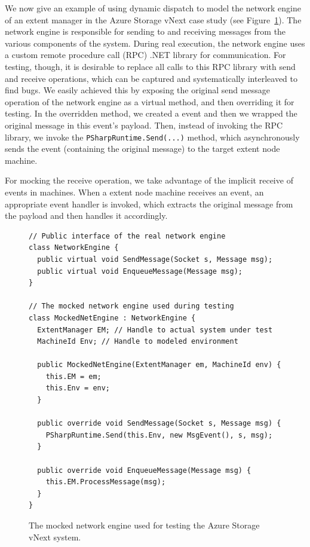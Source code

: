 We now give an example of using dynamic dispatch to model the network engine of an extent manager in the Azure Storage vNext case study (see Figure~\ref{fig:enginecode}). The network engine is responsible for sending to and receiving messages from the various components of the system. During real execution, the network engine uses a custom remote procedure call (RPC) .NET library for communication. For testing, though, it is desirable to replace all calls to this RPC library with \psharp send and receive operations, which can be captured and systematically interleaved to find bugs. We easily achieved this by exposing the original send message operation of the network engine as a virtual method, and then overriding it for testing. In the overridden method, we created a \psharp event and then we wrapped the original message in this event's payload. Then, instead of invoking the RPC library, we invoke the \texttt{PSharpRuntime.Send(...)} method, which asynchronously sends the event (containing the original message) to the target extent node machine.

For mocking the receive operation, we take advantage of the implicit receive of events in \psharp machines. When a extent node machine receives an event, an appropriate event handler is invoked, which extracts the original message from the payload and then handles it accordingly.

\begin{figure}[t]
\begin{lstlisting}
// Public interface of the real network engine
class NetworkEngine {
  public virtual void SendMessage(Socket s, Message msg);
  public virtual void EnqueueMessage(Message msg);
}

// The mocked network engine used during testing
class MockedNetEngine : NetworkEngine {
  ExtentManager EM; // Handle to actual system under test
  MachineId Env; // Handle to modeled environment
  
  public MockedNetEngine(ExtentManager em, MachineId env) {
    this.EM = em;
    this.Env = env;
  }
  
  public override void SendMessage(Socket s, Message msg) {
    PSharpRuntime.Send(this.Env, new MsgEvent(), s, msg);
  }
  
  public override void EnqueueMessage(Message msg) {
    this.EM.ProcessMessage(msg);
  }
}
\end{lstlisting}
\vspace{-2mm}
\caption{The mocked network engine used for testing the Azure Storage vNext system.}
\label{fig:enginecode}
\end{figure}

